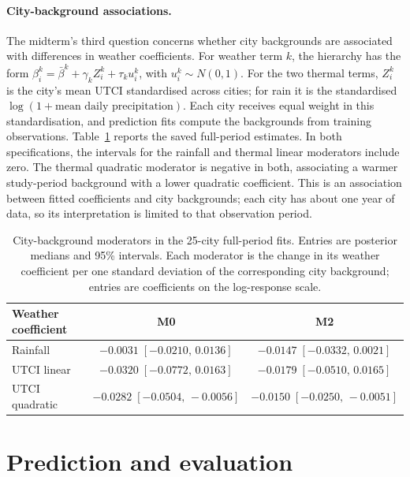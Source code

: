 \documentclass{article}
\begin{document}
\paragraph{City-background associations.}
The midterm's third question concerns whether city backgrounds are associated with differences in
weather coefficients. For weather term $k$, the hierarchy has the form
$\beta_i^k=\bar\beta^k+\gamma_k Z_i^k+\tau_k u_i^k$, with $u_i^k\sim N(0,1)$.
For the two thermal terms, $Z_i^k$ is the city's mean UTCI standardised across cities; for rain it is
the standardised $\log(1+\text{mean daily precipitation})$. Each city receives equal weight in
this standardisation, and prediction fits compute the backgrounds from training observations.
Table~\ref{tab:backgrounds} reports the saved full-period estimates. In both specifications, the
intervals for the rainfall and thermal linear moderators include zero. The thermal quadratic
moderator is negative in both, associating a warmer study-period background with a lower quadratic
coefficient. This is an association between fitted coefficients and city backgrounds; each city has
about one year of data, so its interpretation is limited to that observation period.

\begin{table}[t]
\centering
\footnotesize
\caption{City-background moderators in the 25-city full-period fits. Entries are posterior medians
and 95\% intervals. Each moderator is the change in its weather coefficient per one standard
deviation of the corresponding city background; entries are coefficients on the log-response scale.}
\label{tab:backgrounds}
\begin{tabular}{lcc}
\toprule
Weather coefficient & M0 & M2 \\
\midrule
Rainfall & $-0.0031\;[-0.0210,\,0.0136]$ & $-0.0147\;[-0.0332,\,0.0021]$ \\
UTCI linear & $-0.0320\;[-0.0772,\,0.0163]$ & $-0.0179\;[-0.0510,\,0.0165]$ \\
UTCI quadratic & $-0.0282\;[-0.0504,\,-0.0056]$ & $-0.0150\;[-0.0250,\,-0.0051]$ \\
\bottomrule
\end{tabular}
\end{table}

\section{Prediction and evaluation}
\label{sec:prediction}
\end{document}
